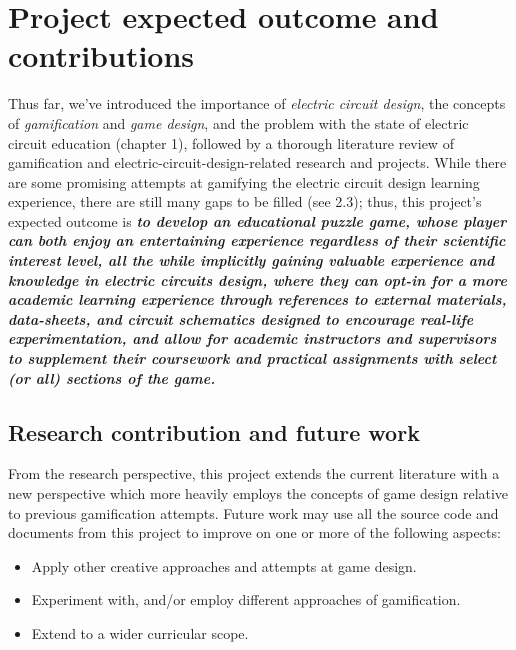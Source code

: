 \documentclass[../main.tex]{subfiles}
\begin{document}
\section{Project expected outcome and contributions}

Thus far, we’ve introduced the importance of \textit{electric circuit design}, the concepts of \textit{gamification} and \textit{game design}, and the problem with the state of electric circuit education (chapter 1), followed by a thorough literature review of gamification and electric-circuit-design-related research and projects. While there are some promising attempts at gamifying the electric circuit design learning experience, there are still many gaps to be filled (see 2.3); thus, this project’s expected outcome is \textbf{\textit{ to develop an educational puzzle game, whose player can both enjoy an entertaining experience regardless of their scientific interest level, all the while implicitly gaining valuable experience and knowledge in electric circuits design, where they can opt-in for a more academic learning experience through references to external materials, data-sheets, and circuit schematics designed to encourage real-life experimentation, and allow for academic instructors and supervisors to supplement their coursework and practical assignments with select (or all) sections of the game.}}

\subsection{Research contribution and future work}

From the research perspective, this project extends the current literature with a new perspective which more heavily employs the concepts of game design relative to previous gamification attempts. Future work may use all the source code and documents from this project to improve on one or more of the following aspects:
\begin{itemize}
    \item Apply other creative approaches and attempts at game design.
    \item Experiment with, and/or employ different approaches of gamification.
    \item Extend to a wider curricular scope.

\end{itemize}
\end{document}
